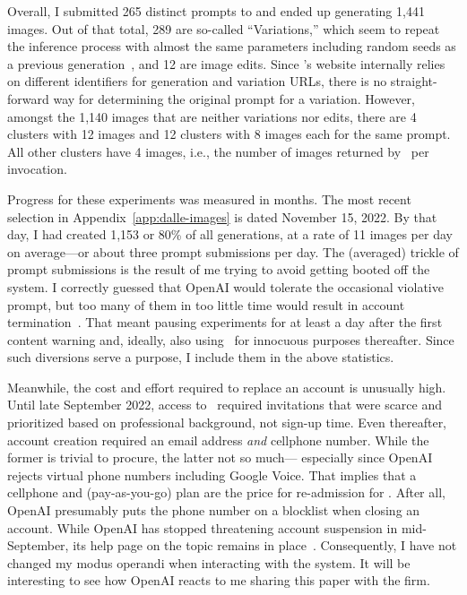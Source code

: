 Overall, I submitted 265 distinct prompts to \DALLE{} and ended up generating
1,441 images. Out of that total, 289 are so-called ``Variations,'' which seem to
repeat the inference process with almost the same parameters including random
seeds as a previous generation~\cite{Bonzie572022}, and 12 are image edits.
Since \DALLE's website internally relies on different identifiers for generation
and variation URLs, there is no straight-forward way for determining the
original prompt for a variation. However, amongst the 1,140 images that are
neither variations nor edits, there are 4 clusters with 12 images and 12
clusters with 8 images each for the same prompt. All other clusters have 4
images, i.e., the number of images returned by \DALLE\ per invocation.

Progress for these experiments was measured in months. The most recent selection
in Appendix~\ref{app:dalle-images} is dated November 15, 2022. By
that day, I had created 1,153 or 80\% of all generations, at a rate of 11 images
per day on average---or about three prompt submissions per day. The (averaged)
trickle of prompt submissions is the result of me trying to avoid getting booted
off the system. I correctly guessed that OpenAI would tolerate the occasional
violative prompt, but too many of them in too little time would result in
account termination~\cite{SpicyElephant2022}. That meant pausing experiments for
at least a day after the first content warning and, ideally, also using \DALLE\
for innocuous purposes thereafter. Since such diversions serve a purpose, I
include them in the above statistics.

Meanwhile, the cost and effort required to replace an account is unusually high.
Until late September 2022, access to \DALLE\ required invitations that were
scarce and prioritized based on professional background, not sign-up time. Even
thereafter, account creation required an email address \emph{and} cellphone
number. While the former is trivial to procure, the latter not so much---%
especially since OpenAI rejects virtual phone numbers including Google Voice.
That implies that a cellphone and (pay-as-you-go) plan are the price for
re-admission for \DALLE. After all, OpenAI presumably puts the phone number on a
blocklist when closing an account. While OpenAI has stopped threatening account
suspension in mid-September, its help page on the topic remains in
place~\cite{Natalie2022}. Consequently, I have not changed my modus operandi
when interacting with the system. It will be interesting to see how OpenAI
reacts to me sharing this paper with the firm.


